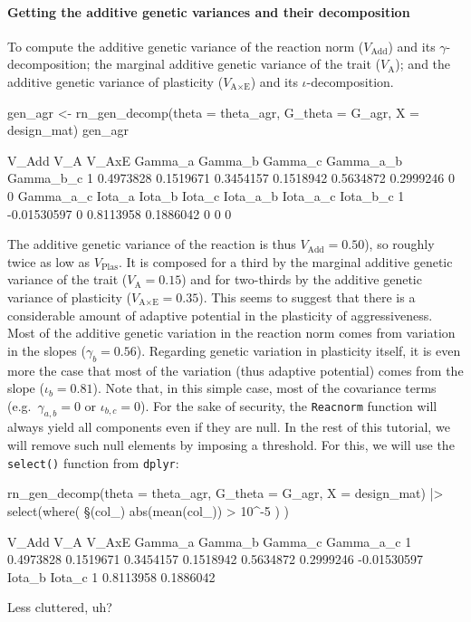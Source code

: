\documentclass[a4paper,12pt,twoside]{article}
\begin{document}
\paragraph{Getting the additive genetic variances and their decomposition}
To compute the additive genetic variance of the reaction norm ($V_{\text{Add}}$) and its $\gamma$-decomposition; the marginal additive genetic variance of the trait ($V_{\text{A}}$); and the additive genetic variance of plasticity ($V_{\text{A}\times\text{E}}$) and its $\iota$-decomposition.
\begin{Rinput}
gen_agr <-
    rn_gen_decomp(theta = theta_agr, G_theta = G_agr, X = design_mat)
gen_agr
\end{Rinput}
\begin{Routput}
      V_Add       V_A     V_AxE   Gamma_a   Gamma_b   Gamma_c Gamma_a_b Gamma_b_c
1 0.4973828 0.1519671 0.3454157 0.1518942 0.5634872 0.2999246         0         0
    Gamma_a_c Iota_a    Iota_b    Iota_c Iota_a_b Iota_a_c Iota_b_c
1 -0.01530597      0 0.8113958 0.1886042        0        0        0
\end{Routput}
The additive genetic variance of the reaction is thus $V_{\text{Add}} = 0.50$), so roughly twice as low as $V_{\text{Plas}}$.
It is composed for a third by the marginal additive genetic variance of the trait ($V_{\text{A}} = 0.15$) and for two-thirds by the additive genetic variance of plasticity ($V_{\text{A}\times\text{E}} = 0.35$).
This seems to suggest that there is a considerable amount of adaptive potential in the plasticity of aggressiveness.
Most of the additive genetic variation in the reaction norm comes from variation in the slopes ($\gamma_{b}=0.56$). Regarding genetic variation in plasticity itself, it is even more the case that most of the variation (thus adaptive potential) comes from the slope ($\iota_{b}=0.81$).
Note that, in this simple case, most of the covariance terms (e.g.\ $\gamma_{a,b}=0$ or $\iota_{b,c}=0$).
For the sake of security, the \texttt{Reacnorm} function will always yield all components even if they are null.
In the rest of this tutorial, we will remove such null elements by imposing a threshold. For this, we will use the \texttt{select()} function from \texttt{dplyr}:
\begin{Rinput}
rn_gen_decomp(theta = theta_agr, G_theta = G_agr, X = design_mat) |>
    select(where( \§§(col_) { abs(mean(col_)) > 10^-5 }) ) 
\end{Rinput}
\begin{Routput}
      V_Add       V_A     V_AxE   Gamma_a   Gamma_b   Gamma_c   Gamma_a_c
1 0.4973828 0.1519671 0.3454157 0.1518942 0.5634872 0.2999246 -0.01530597
     Iota_b    Iota_c
1 0.8113958 0.1886042
\end{Routput}
Less cluttered, uh?
\end{document}
